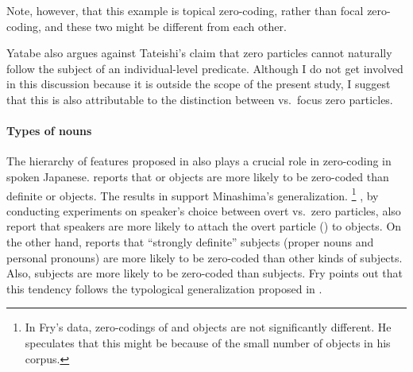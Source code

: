 Note, however, that this example is topical zero-coding,
rather than focal zero-coding, and
these two might be different from each other.

Yatabe also argues against Tateishi's claim that
zero particles cannot naturally follow
the subject of an individual-level predicate.
Although I do not get involved in this discussion
because it is outside the scope of the present study,
I suggest that this is also attributable to
the distinction between  vs.~focus zero particles.
%


\paragraph{Types of nouns}

The hierarchy of features proposed in 
also plays a crucial role in zero-coding in spoken Japanese.
 reports that
 or  objects are more likely to be zero-coded
than definite or  objects.
The results in  support Minashima's generalization.%
 \footnote{
 In Fry's data, zero-codings of  and  objects are not
 significantly different.
 He speculates that this might be because of the small number of
  objects in his corpus.
 }
, by conducting experiments on speaker's choice between overt vs.~zero particles,
also report that speakers are more likely to attach the overt particle () to  objects.
On the other hand,
 reports that
``strongly definite'' subjects (proper nouns and personal pronouns)
are more likely to be zero-coded than other kinds of subjects.
Also,  subjects are more likely to be zero-coded than
 subjects.
Fry points out that this tendency follows the typological generalization
proposed in .

